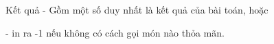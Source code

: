Kết quả
- Gồm một số duy nhất là kết quả của bài toán, hoặc   


   - in ra -1 nếu không có cách gọi món nào thỏa mãn.